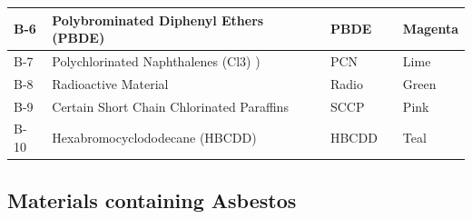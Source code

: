 \documentclass{article}
\begin{document}
\begin{center}
\begin{table}[H]
\begin{tabular}{|ll|l|ll|}
\multicolumn{1}{|l|}{B-6 }    &  Polybrominated Diphenyl Ethers (PBDE)                                 &         PBDE    &           \multicolumn{1}{l|}{\cellcolor[HTML]{F518C7}} & Magenta      \\ \hline
\multicolumn{1}{|l|}{B-7}    &  Polychlorinated Naphthalenes (Cl3) )                                 &         PCN    &           \multicolumn{1}{l|}{\cellcolor[HTML]{DEF518}} & Lime      \\ \hline
\multicolumn{1}{|l|}{B-8 }    &  Radioactive Material                                 &         Radio    &           \multicolumn{1}{l|}{\cellcolor[HTML]{6DF518}} & Green      \\ \hline
\multicolumn{1}{|l|}{B-9}    &  Certain Short Chain Chlorinated Paraffins                                 &         SCCP    &           \multicolumn{1}{l|}{\cellcolor[HTML]{F518D4}} & Pink      \\ \hline
\multicolumn{1}{|l|}{B-10}    &  Hexabromocyclododecane (HBCDD)                                 &         HBCDD    &           \multicolumn{1}{l|}{\cellcolor[HTML]{0B421B}} & Teal      \\ \hline
\end{tabular}
\end{table}
\end{center}

\subsection{Materials containing Asbestos}
\end{document}
